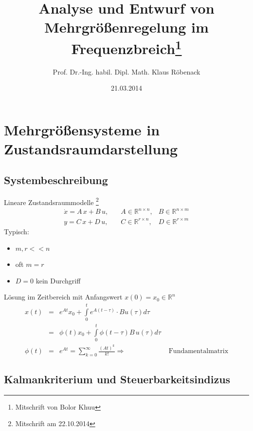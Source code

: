 \documentclass[ngerman]{tudscrreprt}
\begin{document}
 \department{}   \title{Analyse und Entwurf von Mehrgrößenregelung im Frequenzbreich\footnote{Mitschrift von Bolor Khuu}}
\author{Prof. Dr.-Ing. habil. Dipl. Math. Klaus Röbenack}
\date{21.03.2014}
\maketitle
\tableofcontents
\newpage
\chapter{Mehrgrößensysteme in Zustandsraumdarstellung}
\section{Systembeschreibung}
Lineare Zustandsraummodelle \footnote{Mitschrift am 22.10.2014}
\begin{equation*}
\begin{matrix}
\dot x = A\,x + B\,u, \quad&A\in \mathbb{R}^{n\times n},&B\in \mathbb{R}^{n\times m}\\ 
     y = C\,x + D\,u, \quad&C\in \mathbb{R}^{r\times n},&D\in \mathbb{R}^{r\times m} 
\end{matrix}
\end{equation*}
Typisch:
\begin{itemize}
\item $m,r << n$ 
\item oft $m = r$
\item $D= 0$ kein Durchgriff
\end{itemize}
Lösung im Zeitbereich mit Anfangswert $x(0) = x_0 \in \mathbb{R}^{n}$
\begin{equation*}
\begin{matrix}
x(t) 	&=& e^{At}x_0 + \int\limits_{0}^{t}e^{A(t-\tau)}\cdot B u(\tau)d\tau &\\ 
		&=&\phi(t)x_0 + \int\limits_{0}^{t}\phi(t-\tau)B\,u(\tau)d\tau&\\ 
\phi(t) &=&e^{At} = \sum\limits_{k=0}^{\infty}\frac{(At)^{k}}{k!} \Rightarrow &\text{ Fundamentalmatrix}
\end{matrix}
\end{equation*}
\section{Kalmankriterium und Steuerbarkeitsindizus}
\end{document}

